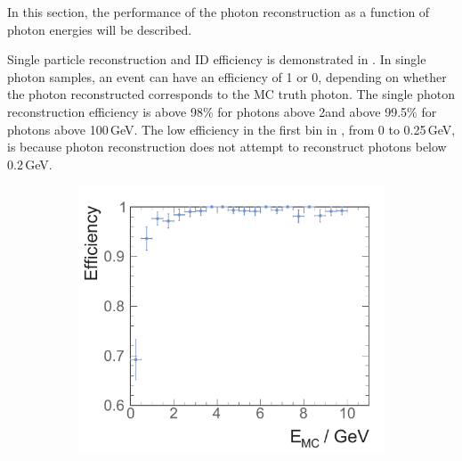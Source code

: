 In this section, the performance of the photon reconstruction as a function of photon energies will be described. 

Single particle reconstruction and ID efficiency is demonstrated in . In single photon samples, an event can have an efficiency of 1 or 0, depending on whether the photon reconstructed corresponds to the MC truth photon. The single photon reconstruction efficiency is above 98\% for photons above 2\GeV and above 99.5\% for photons above 100\,GeV.  The low efficiency in the first bin in , from 0 to 0.25\,GeV, is because photon reconstruction does not attempt to reconstruct photons below 0.2\,GeV.

\begin{figure}[tbph]
\centering
    \begin{subfigure}[b]{0.45\textwidth}
        \includegraphics[width=\textwidth]{photon/singlePhotonEff2fullEdt}
        \caption{}
        \label{fig:photonSingleEffLow}
    \end{subfigure}
    \begin{subfigure}[b]{0.45\textwidth}

\end{subfigure}
\end{figure}
